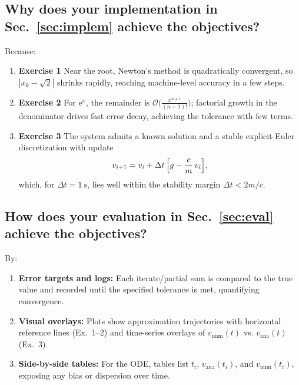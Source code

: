 \subsection{Why does your implementation in Sec.~\ref{sec:implem} achieve the objectives?}
Because:
\begin{enumerate}
  \item \textbf{Exercise 1} Near the root, Newton’s method is quadratically convergent,
  so \(|x_{k}-\sqrt{2}|\) shrinks rapidly, reaching machine-level accuracy in a few steps.
  \item \textbf{Exercise 2} For \(\mathrm{e}^x\), the remainder is
  \(\mathcal{O}\!\bigl(\tfrac{x^{n+1}}{(n+1)!}\bigr)\); factorial growth in the denominator drives
  fast error decay, achieving the tolerance with few terms.
  \item \textbf{Exercise 3} The system admits a known solution and a stable
  explicit-Euler discretization with update
  \[
    v_{i+1}=v_i+\Delta t\,\Bigl[g-\frac{c}{m}\,v_i\Bigr],
  \]
  which, for \(\Delta t=1~\mathrm{s}\), lies well within the stability margin \(\Delta t<2m/c\).
\end{enumerate}
	
\subsection{How does your evaluation in Sec.~\ref{sec:eval} achieve the objectives?}
By:
\begin{enumerate}
  \item \textbf{Error targets and logs:} Each iterate/partial sum is compared to the true value and
  recorded until the specified tolerance is met, quantifying convergence.
  \item \textbf{Visual overlays:} Plots show approximation trajectories with horizontal reference
  lines (Ex.~1–2) and time-series overlays of \(v_{\mathrm{num}}(t)\) vs. \(v_{\mathrm{ana}}(t)\) (Ex.~3).
  \item \textbf{Side-by-side tables:} For the ODE, tables list \(t_i\), \(v_{\mathrm{ana}}(t_i)\),
  and \(v_{\mathrm{num}}(t_i)\), exposing any bias or dispersion over time.
\end{enumerate}
	
